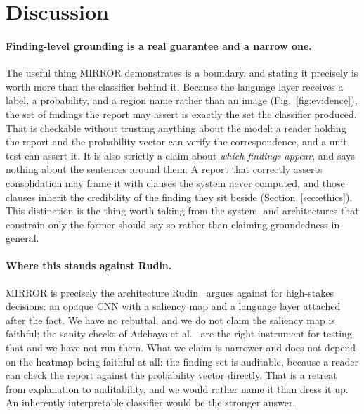 \documentclass[10pt,twocolumn]{article}
\begin{document}
\section{Discussion}
\label{sec:discussion}

\paragraph{Finding-level grounding is a real guarantee and a narrow one.} The
useful thing MIRROR demonstrates is a boundary, and stating it precisely is worth
more than the classifier behind it. Because the language layer receives a label, a
probability, and a region name rather than an image (Fig.~\ref{fig:evidence}), the
set of findings the report may assert is exactly the set the classifier produced.
That is checkable without trusting anything about the model: a reader holding the
report and the probability vector can verify the correspondence, and a unit test
can assert it. It is also strictly a claim about \emph{which findings appear}, and
says nothing about the sentences around them. A report that correctly asserts
consolidation may frame it with clauses the system never computed, and those
clauses inherit the credibility of the finding they sit beside
(Section~\ref{sec:ethics}). This distinction is the thing worth taking from the
system, and architectures that constrain only the former should say so rather than
claiming groundedness in general.

\paragraph{Where this stands against Rudin.} MIRROR is precisely the architecture
Rudin~\cite{rudin2019stop} argues against for high-stakes decisions: an opaque CNN
with a saliency map and a language layer attached after the fact. We have no
rebuttal, and we do not claim the saliency map is faithful; the sanity checks of
Adebayo et al.~\cite{adebayo2018sanity} are the right instrument for testing that
and we have not run them. What we claim is narrower and does not depend on the
heatmap being faithful at all: the finding set is auditable, because a reader can
check the report against the probability vector directly. That is a retreat from
explanation to auditability, and we would rather name it than dress it up. An
inherently interpretable classifier would be the stronger answer.
\end{document}
